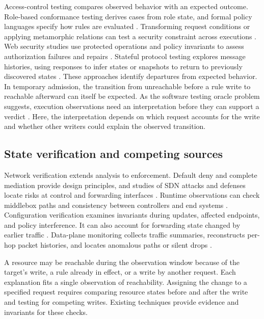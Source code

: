 Access-control testing compares observed behavior with an expected outcome. Role-based conformance testing derives cases from role state, and formal policy languages specify how rules are evaluated \citep{r5,r22}. Transforming request conditions or applying metamorphic relations can test a security constraint across executions \citep{r7,r23}. Web security studies use protected operations and policy invariants to assess authorization failures and repairs \citep{r24,r25,r26}. Stateful protocol testing explores message histories, using responses to infer states or snapshots to return to previously discovered states \citep{r6,r8,r27}. These approaches identify departures from expected behavior. In temporary admission, the transition from unreachable before a rule write to reachable afterward can itself be expected. As the software testing oracle problem suggests, execution observations need an interpretation before they can support a verdict \citep{r28}. Here, the interpretation depends on which request accounts for the write and whether other writers could explain the observed transition.

\subsection{State verification and competing sources}\label{state-verification-and-competing-sources}

Network verification extends analysis to enforcement. Default deny and complete mediation provide design principles, and studies of SDN attacks and defenses locate risks at control and forwarding interfaces \citep{r12,r29}. Runtime observations can check middlebox paths and consistency between controllers and end systems \citep{r10,r30}. Configuration verification examines invariants during updates, affected endpoints, and policy interference. It can also account for forwarding state changed by earlier traffic \citep{r9,r31,r32,r33,r34}. Data-plane monitoring collects traffic summaries, reconstructs per-hop packet histories, and locates anomalous paths or silent drops \citep{r11,r35,r36,r37}.

A resource may be reachable during the observation window because of the target's write, a rule already in effect, or a write by another request. Each explanation fits a single observation of reachability. Assigning the change to a specified request requires comparing resource states before and after the write and testing for competing writes. Existing techniques provide evidence and invariants for these checks.

